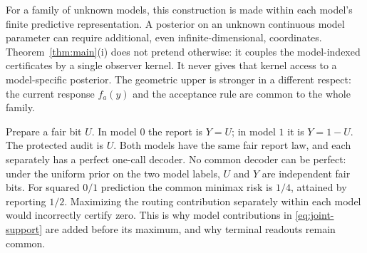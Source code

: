For a family of unknown models, this construction is made within each model's finite predictive representation. A posterior on an unknown continuous model parameter can require additional, even infinite-dimensional, coordinates. Theorem~\ref{thm:main}(i) does not pretend otherwise: it couples the model-indexed certificates by a single observer kernel. It never gives that kernel access to a model-specific posterior. The geometric upper is stronger in a different respect: the current response $f_a(y)$ and the acceptance rule are common to the whole family.

\begin{example}\label{ex:model-routing}
Prepare a fair bit $U$. In model $0$ the report is $Y=U$; in model $1$ it is $Y=1-U$. The protected audit is $U$. Both models have the same fair report law, and each separately has a perfect one-call decoder. No common decoder can be perfect: under the uniform prior on the two model labels, $U$ and $Y$ are independent fair bits. For squared $0/1$ prediction the common minimax risk is $1/4$, attained by reporting $1/2$. Maximizing the routing contribution separately within each model would incorrectly certify zero. This is why model contributions in \eqref{eq:joint-support} are added before its maximum, and why terminal readouts remain common.
\end{example}
